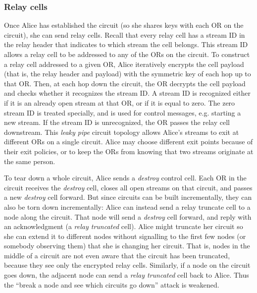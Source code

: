 \documentclass[times,10pt,twocolumn]{article}
\begin{document}
\subsubsection{Relay cells}
Once Alice has established the circuit (so she shares keys with each
OR on the circuit), she can send relay cells.
Recall that every relay cell has a stream ID in the relay header
that indicates to
which stream the cell belongs.
This stream ID allows a relay cell to be addressed to any of the ORs
on the circuit. To
construct a relay cell addressed to a given OR, Alice iteratively
encrypts the cell payload (that is, the relay header and payload)
with the symmetric key of each hop up to that OR. Then, at each hop
down the circuit, the OR decrypts the cell payload and checks whether
it recognizes the stream ID.  A stream ID is recognized either if it
is an already open stream at that OR, or if it is equal to zero. The
zero stream ID is treated specially, and is used for control messages,
e.g. starting a new stream. If the stream ID is unrecognized, the OR
passes the relay cell downstream. This \emph{leaky pipe} circuit topology
allows Alice's streams to exit at different ORs on a single circuit.  
Alice may choose different exit points because of their exit policies,
or to keep the ORs from knowing that two streams
originate at the same person.

To tear down a whole circuit, Alice sends a \emph{destroy} control
cell. Each OR
in the circuit receives the \emph{destroy} cell, closes all open streams on
that circuit, and passes a new \emph{destroy} cell forward. But since circuits
can be built incrementally, they can also be torn down incrementally:
Alice can instead send a relay truncate cell to a node along the circuit. That
node will send a \emph{destroy} cell forward, and reply with an acknowledgment
(a \emph{relay truncated} cell).  Alice might truncate her circuit so
she can extend it
to different nodes without signalling to the first few nodes (or somebody
observing them) that she is changing her circuit. That is, nodes in the
middle of a circuit are not even aware that the circuit has been
truncated, because they see only the encrypted relay cells.
Similarly, if a node on the circuit goes down,
the adjacent node can send a \emph{relay truncated} cell back to
Alice.  Thus the
``break a node and see which circuits go down'' attack is weakened.
\end{document}
